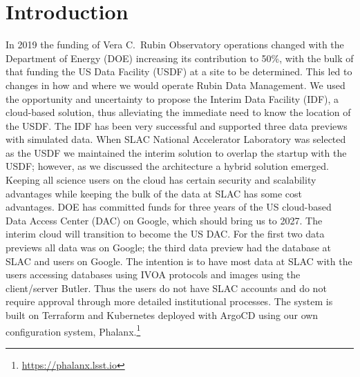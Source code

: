 \section{Introduction}
In 2019 the funding of Vera C.\ Rubin Observatory \cite{2019ApJ...873..111I} operations changed with the Department of Energy (DOE) increasing its contribution to 50\%, with the bulk of that funding the US Data Facility (USDF) at a site to be determined.
This led to changes in how and where we would operate Rubin Data Management.
We used the opportunity and uncertainty to propose the Interim Data Facility (IDF), a cloud-based solution, thus alleviating the immediate need to know the location of the USDF.
The IDF has been very successful and supported three data previews with simulated data.\cite{2021arXiv211115030O}
When SLAC National Accelerator Laboratory was selected as the USDF we maintained the interim solution to overlap the startup with the USDF; however, as we discussed the architecture a hybrid solution emerged.
Keeping all science users on the cloud has certain security and scalability advantages while keeping the bulk of the data at SLAC has some cost advantages.
DOE has committed funds for three years of the US cloud-based Data Access Center (DAC) on Google, which should bring us to 2027.
The interim cloud will transition to become the US DAC.
For the first two data previews all data was on Google; the third data preview had the database at SLAC and users on Google.
The intention is to have most data at SLAC with the users accessing databases using IVOA protocols and images using the client/server Butler.\cite{2024SPIE13101.129Jtmp}
Thus the users do not have SLAC accounts and do not require approval through more detailed institutional processes.
The system is built on Terraform and Kubernetes deployed with ArgoCD using our own configuration system, Phalanx.\footnote{\url{https://phalanx.lsst.io}}










